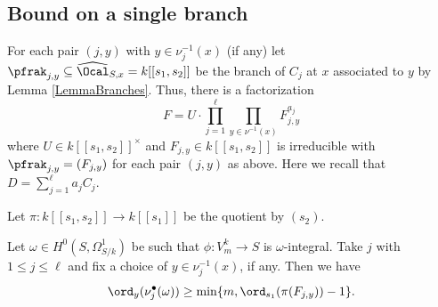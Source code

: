 \subsection{Bound on a single branch} For each pair $(j,y)$ with $y\in \nu_j^{-1}(x)$ (if any) let $\pfrak_{j,y}\subseteq \widehat{\Ocal}_{S,x}=k[[s_1,s_2]]$ be the branch of $C_j$ at $x$ associated to $y$ by Lemma \ref{LemmaBranches}. Thus, there is a factorization
$$
F=U\cdot \prod_{j=1}^\ell \prod_{y\in \nu^{-1}(x)} F_{j,y}^{a_j}
$$
where $U\in k[[s_1,s_2]]^\times$ and $F_{j,y}\in k[[s_1,s_2]]$ is irreducible with $\pfrak_{j,y}=(F_{j,y})$ for each pair $(j,y)$ as above. Here we recall that $D=\sum_{j=1}^\ell a_jC_j$.

Let $\pi:k[[s_1,s_2]]\to k[[s_1]]$ be the quotient by $(s_2)$.

\begin{lemma}
\notready \label{LemmaIndividual} Let $\omega\in H^0(S,\Omega^1_{S/k})$ be such that $\phi:V_m^k\to S$ is $\omega$-integral. Take $j$ with $1\le j\le \ell$ and fix a choice of $y\in \nu_j^{-1}(x)$, if any. Then we have
$$
\ord_y (\nu_j^\bullet(\omega))\ge \min\{m, \ord_{s_1}(\pi(F_{j,y})) -1\}.
$$
\end{lemma}
